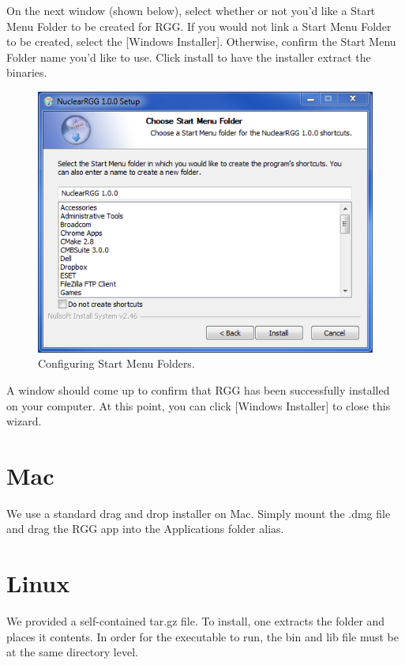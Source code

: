 On the next window (shown below), select whether or not you'd like a Start Menu Folder to be created for RGG.  If you would not link a Start Menu Folder to be created, select the [Windows Installer].  Otherwise, confirm the Start Menu Folder name you'd like to use.  Click install to have the installer extract the binaries.

\begin{figure}[H]
	\begin{center}
		\includegraphics[width=0.5\linewidth]{Images/windows-install-3.png}
		\caption{Configuring Start Menu Folders.}
		\label{fig:WindowsInstall3}
	\end{center}
\end{figure}

A window should come up to confirm that RGG has been successfully installed on your computer.  At this point, you can click [Windows Installer] to close this wizard.

\section{Mac}
We use a standard drag and drop installer on Mac.  Simply mount the .dmg file and drag the RGG app into the Applications folder alias.

\section{Linux}
We provided a self-contained tar.gz file.  To install, one extracts the folder and places it contents.  In order for the executable to run, the bin and lib file must be at the same directory level.

